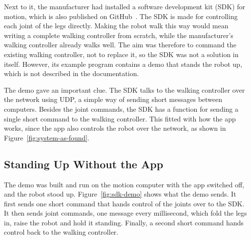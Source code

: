 Next to it, the manufacturer had installed a software development kit (SDK) for motion, which is also
published on GitHub~\cite{motionsdk}. The SDK is made for controlling each joint of the legs directly. Making
the robot walk this way would mean writing a complete walking controller from scratch, while the
manufacturer's walking controller already walks well. The aim was therefore to command the existing walking
controller, not to replace it, so the SDK was not a solution in itself. However, its example program
contains a demo that stands the robot up, which is not described in the documentation.

The demo gave an important clue. The SDK talks to the walking controller over the network using UDP, a
simple way of sending short messages between computers. Besides the joint commands, the SDK has a function
for sending a single short command to the walking controller. This fitted with how the app works, since
the app also controls the robot over the network, as shown in Figure~\ref{fig:system-as-found}.

\subsection{Standing Up Without the App}
\label{sec:sdk-stand}

The demo was built and run on the motion computer with the app switched off, and the robot stood up.
Figure~\ref{fig:sdk-demo} shows what the demo sends. It first sends one short command that hands control of
the joints over to the SDK. It then sends joint commands, one message every millisecond, which fold the
legs in, raise the robot and hold it standing. Finally, a second short command hands control back to the
walking controller.

